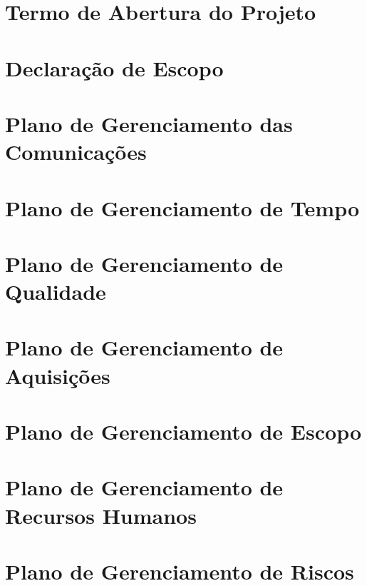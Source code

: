 \begin{anexosenv}

\partanexos

\chapter{Termo de Abertura do Projeto}

  
  
\chapter{Declaração de Escopo}

  

\chapter{Plano de Gerenciamento das Comunicações}

  

\chapter{Plano de Gerenciamento de Tempo}

  

\chapter{Plano de Gerenciamento de Qualidade}

  
  
\chapter{Plano de Gerenciamento de Aquisições}

  

\chapter{Plano de Gerenciamento de Escopo}

 

\chapter{Plano de Gerenciamento de Recursos Humanos}

  
  
\chapter{Plano de Gerenciamento de Riscos}

  

  
\end{anexosenv}

